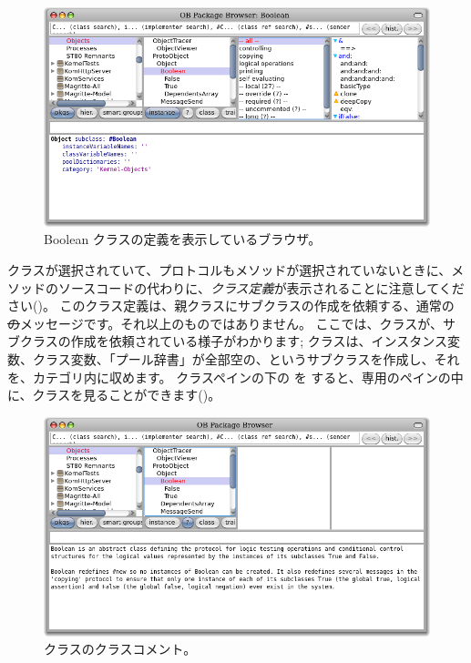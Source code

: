 \documentclass[a4paper,10pt,twoside]{book}
\begin{document}

\begin{figure}[hbt]
\centerline {\includegraphics[width=\textwidth]{Kernel-objects-boolean}}
\caption{Boolean クラスの定義を表示しているブラウザ。
}
\end{figure}

クラスが選択されていて、プロトコルもメソッドが選択されていないときに、メソッドのソースコードの代わりに、\emph{クラス定義}が表示されることに注意してください()。
このクラス定義は、親クラスにサブクラスの作成を依頼する、通常の \st のメッセージです。それ以上のものではありません。
ここでは、クラスが、サブクラスの作成を依頼されている様子がわかります; クラスは、インスタンス変数、クラス変数、「プール辞書」が全部空の、というサブクラスを作成し、それを、カテゴリ内に収めます。
クラスペインの下の を \click すると、専用のペインの中に、クラスを見ることができます()。

\begin{figure}[hbt]
\centerline {\includegraphics[width=\textwidth]{classComment}}
\caption{クラスのクラスコメント。
}
\end{figure}
\end{document}
